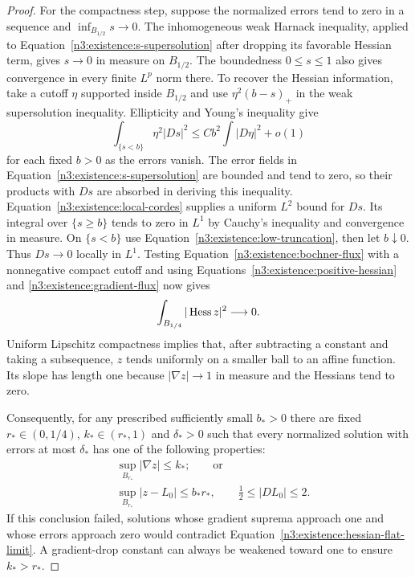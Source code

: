 \begin{proof}
For the compactness step, suppose
the normalized errors tend to zero in a sequence and
$\inf_{B_{1/2}}s\to0$.  The inhomogeneous weak Harnack inequality,
applied to Equation~\eqref{n3:existence:s-supersolution} after dropping
its favorable Hessian term, gives $s\to0$ in measure on $B_{1/2}$.
The boundedness $0\le s\le1$ also gives convergence in every finite
$L^p$ norm there.  To recover the Hessian information, take a cutoff
$\eta$ supported inside $B_{1/2}$ and use
$\eta^2(b-s)_+$ in the weak supersolution inequality.  Ellipticity
and Young's inequality give
\begin{equation}\label{n3:existence:low-truncation}
 \int_{\{s<b\}}\eta^2|Ds|^2
 \le Cb^2\int|D\eta|^2+o(1)
\end{equation}
for each fixed $b>0$ as the errors vanish.  The error fields in
Equation~\eqref{n3:existence:s-supersolution} are bounded and tend to
zero, so their products with $Ds$ are absorbed in deriving this
inequality.  Equation~\eqref{n3:existence:local-cordes} supplies a
uniform $L^2$ bound for $Ds$.  Its integral over $\{s\ge b\}$ tends
to zero in $L^1$ by Cauchy's inequality and convergence in measure.
On $\{s<b\}$ use Equation~\eqref{n3:existence:low-truncation}, then let
$b\downarrow0$.  Thus $Ds\to0$ locally in $L^1$.
Testing Equation~\eqref{n3:existence:bochner-flux} with a nonnegative
compact cutoff and using Equations~\eqref{n3:existence:positive-hessian}
and \eqref{n3:existence:gradient-flux} now gives
\begin{equation}\label{n3:existence:hessian-flat-limit}
 \int_{B_{1/4}}|\operatorname{Hess} z|^2\longrightarrow0.
\end{equation}
Uniform Lipschitz compactness implies that, after subtracting a
constant and taking a subsequence, $z$ tends uniformly on a smaller
ball to an affine function.  Its slope has length one because
$|\nabla z|\to1$ in measure and the Hessians tend to zero.

Consequently, for any prescribed sufficiently small $b_*>0$ there
are fixed $r_*\in(0,1/4)$, $k_*\in(r_*,1)$ and $\delta_*>0$ such
that every normalized solution with errors at most $\delta_*$ has
one of the following properties:
\begin{equation}\label{n3:existence:drop-or-flat}
 \begin{split}
 &\sup_{B_{r_*}}|\nabla z|\le k_*;\qquad\text{or}\\
 &\sup_{B_{r_*}}|z-L_0|\le b_*r_*,
       \qquad \tfrac12\le|DL_0|\le2.
 \end{split}
\end{equation}
If this conclusion failed, solutions whose gradient suprema approach
one and whose errors approach zero would contradict
Equation~\eqref{n3:existence:hessian-flat-limit}.  A gradient-drop
constant can always be weakened toward one to ensure $k_*>r_*$.


\end{proof}
